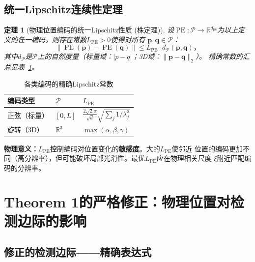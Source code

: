 \documentclass[11pt,a4paper]{article}
\newtheorem{theorem}{定理}[section]
\theoremstyle{remark}
\DeclareMathOperator{\PE}{PE}
\newcommand{\R}{\mathbb{R}}
\newcommand{\Ppos}{\mathcal{P}}
\newcommand{\pe}{\mathrm{pe}}
\begin{document}
\subsection{统一Lipschitz连续性定理}

\begin{theorem}[物理位置编码的统一Lipschitz性质 (株定理)]
\label{thm:1.4.1}
设$\PE: \Ppos \to \R^{d_{\pe}}$为以上定义的任一编码。则存在常数$L_{\PE} > 0$使得对所有
$\mathbf{p}, \mathbf{q} \in \Ppos$：
\begin{equation}
    \boxed{
    \|\PE(\mathbf{p}) - \PE(\mathbf{q})\| \leq L_{\PE} \cdot d_{\Ppos}(\mathbf{p}, \mathbf{q})
    }，
\end{equation}
其中$d_{\Ppos}$是$\Ppos$上的自然度量（标量域：$|p-q|$；3D域：$\|\mathbf{p} - \mathbf{q}\|_2$）。
精确常数的汇总见表~\ref{tab:lipschitz}。
\end{theorem}

\begin{table}[htbp]
\centering
\caption{各类编码的精确Lipschitz常数}
\label{tab:lipschitz}
\begin{tabular}{@{}lll@{}}
\toprule
\textbf{编码类型} & $\Ppos$ & $L_{\PE}$ \\
\midrule
正弦（标量） & $[0, L]$ & $\frac{2\sqrt{2}\,\pi}{\sqrt{d}}\sqrt{\sum_j 1/\lambda_j^2}$ \\
旋转（3D） & $\R^3$ & $\max(\alpha, \beta, \gamma)$ \\
\bottomrule
\end{tabular}
\end{table}

\textbf{物理意义：}$L_{\PE}$控制编码对位置变化的\textbf{敏感度}。大的$L_{\PE}$使邻近
位置的编码更加不同（高分辨率），但可能破坏局部光滑性。最优$L_{\PE}$应在物理相关尺度
$\xi$附近匹配编码的分辨率。

\section{Theorem 1的严格修正：物理位置对检测边际的影响}

\subsection{修正的检测边际——精确表达式}
\end{document}
